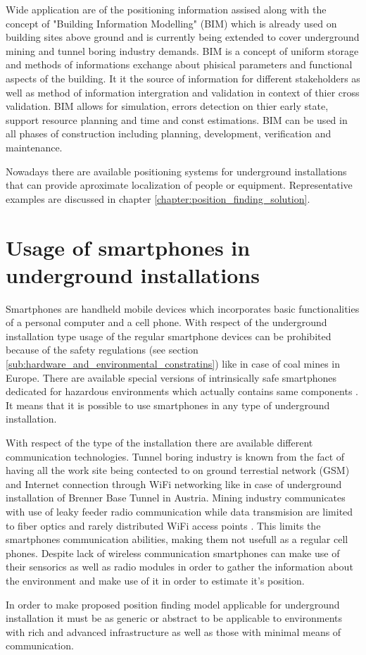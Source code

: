 \documentclass[../main.tex]{subfiles}
\begin{document}
Wide application are of the positioning information assised along with the concept of "Building Information Modelling" (BIM) which is already used on building sites above ground and is currently being extended to cover underground mining and tunnel boring industry demands\cite{article_sensors_for_indoor_navi}. BIM is a concept of uniform storage and methods of informations exchange about phisical parameters and functional aspects of the building. It it the source of information for different stakeholders as well as method of information intergration and validation in context of thier cross validation. BIM allows for simulation, errors detection on thier early state, support resource planning and time and const estimations. BIM can be used in all phases of construction including planning, development, verification and maintenance.


Nowadays there are available positioning systems for underground installations that can provide aproximate localization of people or equipment. Representative examples are discussed in chapter \ref{chapter:position_finding_solution}.


\section{Usage of smartphones in underground installations}

Smartphones are handheld mobile devices which incorporates basic functionalities of a personal computer and a cell phone. With respect of the underground installation type usage of the regular smartphone devices can be prohibited because of the safety regulations (see section \ref{sub:hardware_and_environmental_constratins}) like in case of coal mines in Europe\cite{Thesis_CM}. There are available special versions of intrinsically safe smartphones dedicated for hazardous environments which actually contains same components \cite{misc_atex_smartphone_brochure}. It means that it is possible to use smartphones in any type of underground installation.

With respect of the type of the installation there are available different communication technologies. Tunnel boring industry is known from the fact of having all the work site being contected to on ground terrestial network (GSM) and Internet connection through WiFi networking like in case of underground installation of Brenner Base Tunnel in Austria. Mining industry communicates with use of leaky feeder radio communication while data transmision are limited to fiber optics and rarely distributed WiFi access points \cite{thesis_tablet_positioning}. This limits the smartphones communication abilities, making them not usefull as a regular cell phones. Despite lack of wireless communication smartphones can make use of their sensorics as well as radio modules in order to gather the information about the environment and make use of it in order to estimate it's position.

In order to make proposed position finding model applicable for underground installation it must be as generic or abstract to be applicable to environments with rich and advanced infrastructure as well as those with minimal means of communication.
\end{document}
